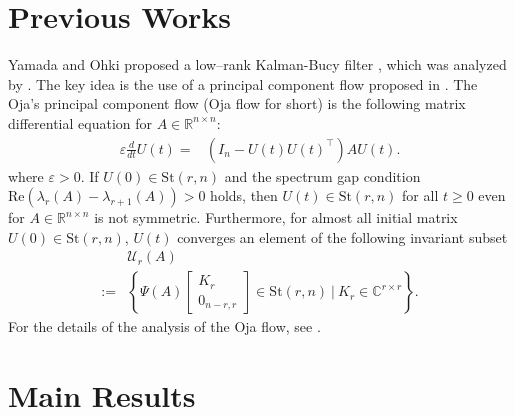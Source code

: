 \documentclass[fleqn,10pt]{SICE_FES26}
\begin{document}
\section{Previous Works}

Yamada and Ohki proposed a low--rank Kalman-Bucy filter \cite{yamada2020lowrank}, which was analyzed by  \cite{yamada2021comparison,TsuzukiOhki2024}. 
The key idea is the use of a principal component flow proposed in \cite{bonnabel2012geometry}. 
	The Oja's principal component flow (Oja flow for short) is the following matrix differential equation for $A \in {\mathbb{R}}^{n\times n}$:  
    \begin{align}
    \varepsilon \frac{d}{dt} U(t) = & ( I_{n} - U(t) U(t) ^{\top} ) A U(t) .
    \label{eq:Oja_flow}
    \end{align}
    where $\varepsilon >0$. 
    If $U(0) \in {\mathrm{St}}(r,n)$ and the spectrum gap condition ${\mathrm{Re}}(\lambda _{r}(A) - \lambda _{r+1}(A)) >0$ holds, then $U(t) \in  {\mathrm{St}}(r,n)$ for all $t\geq 0$ even for $A \in {\mathbb{R}}^{n\times n}$ is not symmetric.  
    Furthermore, for almost all initial matrix $U(0) \in {\mathrm{St}}(r,n)$, $U(t)$ converges an element of the following invariant subset 
    \begin{align*}
    &{\mathcal{U}}_{r} (A) 
    \\
    := &\left\{ 
    \Psi (A) \begin{bmatrix} K_{r} \\ 0 _{n-r,r}\end{bmatrix} \in {\mathrm{St}}(r,n) \ | \  K_{r} \in {\mathbb{C}}^{r\times r}
    \right\}
    .
    \end{align*}
    For the details of the analysis of the Oja flow, see \cite{TsuzukiOhki2025global}. 
    
    
    

\section{Main Results}
\end{document}

